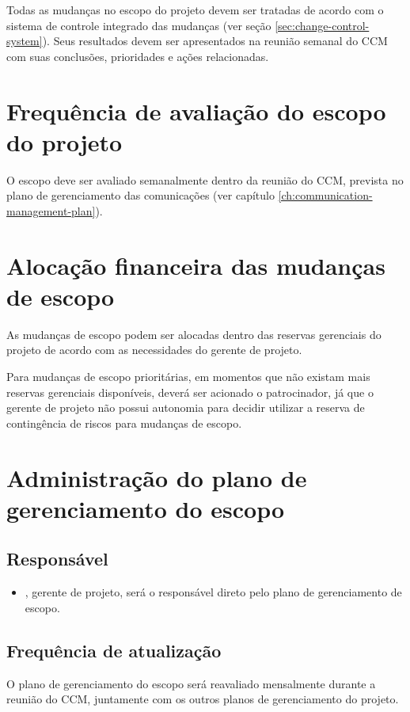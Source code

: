 Todas as mudanças no escopo do projeto devem ser tratadas de acordo com o sistema de controle integrado das mudanças (ver seção \ref{sec:change-control-system}). Seus resultados devem ser apresentados na reunião semanal do CCM com suas conclusões, prioridades e ações relacionadas.

\section{Frequência de avaliação do escopo do projeto}

O escopo deve ser avaliado semanalmente dentro da reunião do CCM, prevista no plano de gerenciamento das comunicações (ver capítulo \ref{ch:communication-management-plan}).

\section{Alocação financeira das mudanças de escopo}

As mudanças de escopo podem ser alocadas dentro das reservas gerenciais do projeto de acordo com as necessidades do gerente de projeto.

Para mudanças de escopo prioritárias, em momentos que não existam mais reservas gerenciais disponíveis, deverá ser acionado o patrocinador, já que o gerente de projeto não possui autonomia para decidir utilizar a reserva de contingência de riscos para mudanças de escopo.

\section{Administração do plano de gerenciamento do escopo}

\subsection{Responsável}

\begin{itemize}
	\item \projectManagerName{}, gerente de projeto, será o responsável direto pelo plano de gerenciamento de escopo.
\end{itemize}

\subsection{Frequência de atualização}

O plano de gerenciamento do escopo será reavaliado mensalmente durante a reunião do CCM, juntamente com os outros planos de gerenciamento do projeto.

